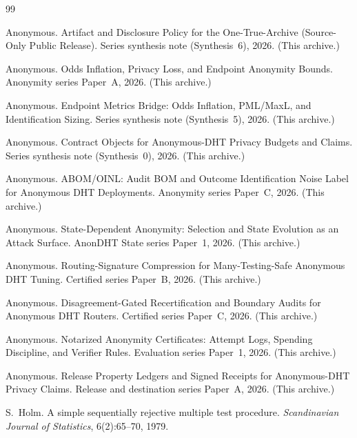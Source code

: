 \documentclass[11pt]{article}
\begin{document}
\begin{thebibliography}{99}\small

Anonymous.
\newblock Artifact and Disclosure Policy for the One-True-Archive (Source-Only Public Release).
\newblock Series synthesis note (Synthesis~6), 2026. (This archive.)

Anonymous.
\newblock Odds Inflation, Privacy Loss, and Endpoint Anonymity Bounds.
\newblock Anonymity series Paper~A, 2026. (This archive.)

Anonymous.
\newblock Endpoint Metrics Bridge: Odds Inflation, PML/MaxL, and Identification Sizing.
\newblock Series synthesis note (Synthesis~5), 2026. (This archive.)

Anonymous.
\newblock Contract Objects for Anonymous-DHT Privacy Budgets and Claims.
\newblock Series synthesis note (Synthesis~0), 2026. (This archive.)

Anonymous.
\newblock ABOM/OINL: Audit BOM and Outcome Identification Noise Label for Anonymous DHT Deployments.
\newblock Anonymity series Paper~C, 2026. (This archive.)

Anonymous.
\newblock State-Dependent Anonymity: Selection and State Evolution as an Attack Surface.
\newblock AnonDHT State series Paper~1, 2026. (This archive.)

Anonymous.
\newblock Routing-Signature Compression for Many-Testing-Safe Anonymous DHT Tuning.
\newblock Certified series Paper~B, 2026. (This archive.)

Anonymous.
\newblock Disagreement-Gated Recertification and Boundary Audits for Anonymous DHT Routers.
\newblock Certified series Paper~C, 2026. (This archive.)

Anonymous.
\newblock Notarized Anonymity Certificates: Attempt Logs, Spending Discipline, and Verifier Rules.
\newblock Evaluation series Paper~1, 2026. (This archive.)

Anonymous.
\newblock Release Property Ledgers and Signed Receipts for Anonymous-DHT Privacy Claims.
\newblock Release and destination series Paper~A, 2026. (This archive.)

S.~Holm.
\newblock A simple sequentially rejective multiple test procedure.
\newblock \emph{Scandinavian Journal of Statistics}, 6(2):65--70, 1979.

\end{thebibliography}
\end{document}
